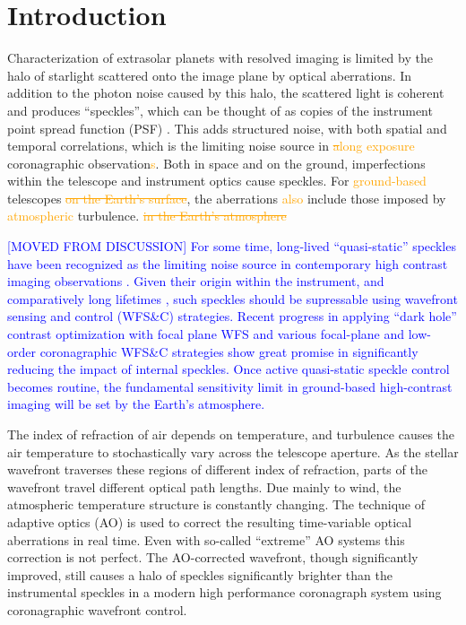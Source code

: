 \documentclass[10pt,preprint]{aastex631}
\newcommand{\jrmadd}[1]{\textcolor{blue}{#1}}
\newcommand{\ogadd}[1]{\textcolor{orange}{#1}}
\newcommand{\ogrmv}[1]{\textcolor{orange}{\sout{#1}}}
\begin{document}
\section{Introduction}
Characterization of extrasolar planets with resolved imaging is limited by the halo of starlight scattered onto the image plane by optical aberrations.  In addition to the photon noise caused by this halo, the scattered light is coherent and produces ``speckles'', which can be thought of as copies of the instrument point spread function (PSF) \citep{1995PASP..107..386M}.  This adds structured noise, with both spatial and temporal correlations, which is the limiting noise source in \ogrmv{a}\ogadd{long exposure} coronagraphic observation\ogadd{s}.    Both in space and on the ground, imperfections within the telescope and instrument optics cause speckles.   For \ogadd{ground-based} telescopes \ogrmv{on the Earth's surface}, the aberrations \ogadd{also} include those imposed by \ogadd{atmospheric} turbulence. \ogrmv{in the Earth's atmosphere}

\jrmadd{[MOVED FROM DISCUSSION] For some time, long-lived ``quasi-static'' speckles have been recognized as the limiting noise source in contemporary high contrast imaging observations \citep[e.g.][]{2007ApJ...654..633H}.  Given their origin within the instrument, and comparatively long lifetimes \citep{2012A&A...541A.136M}, such speckles should be supressable using wavefront sensing and control (WFS\&C) strategies.  Recent progress in applying ``dark hole'' contrast optimization with focal plane WFS \citep{2020A&A...638A.117P} and various focal-plane \citep[e.g.][]{2010A&A...509A..31G} and low-order coronagraphic WFS\&C strategies \citep[e.g.][]{2017PASP..129i5002S} show great promise in significantly reducing the impact of internal speckles.  Once active quasi-static speckle control becomes routine, the fundamental sensitivity limit in ground-based high-contrast imaging will be set by the Earth's atmosphere. }


The index of refraction of air depends on temperature, and turbulence causes the air temperature to stochastically vary across the telescope aperture.  As the stellar wavefront traverses these regions of different index of refraction, parts of the wavefront travel different optical path lengths.  Due mainly to wind, the atmospheric temperature structure is constantly changing.  The technique of adaptive optics (AO) is used to correct the resulting time-variable optical aberrations in real time.  Even with so-called ``extreme'' AO systems \citep[ExAO, ][]{2018ARAA..56..315G} this correction is not perfect.  The AO-corrected wavefront, though significantly improved, still causes a halo of speckles significantly brighter than the instrumental speckles in a modern high performance coronagraph system using coronagraphic wavefront control.
\end{document}
